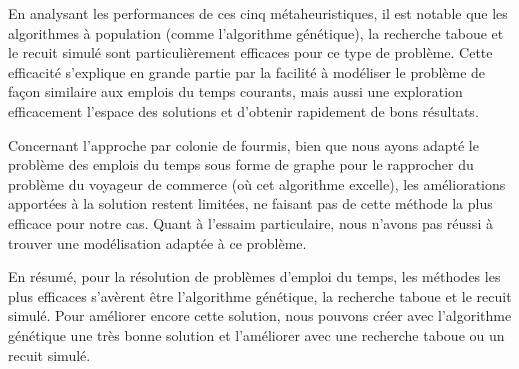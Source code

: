 
En analysant les performances de ces cinq métaheuristiques, il est notable que les algorithmes à population (comme l'algorithme génétique), la recherche taboue et le recuit simulé sont particulièrement efficaces pour ce type de problème.
Cette efficacité s'explique en grande partie par la facilité à modéliser le problème de façon similaire aux emplois du temps courants, mais aussi une exploration efficacement l'espace des solutions et d'obtenir rapidement de bons résultats.

Concernant l'approche par colonie de fourmis, bien que nous ayons adapté le problème des emplois du temps sous forme de graphe pour le rapprocher du problème du voyageur de commerce (où cet algorithme excelle), les améliorations apportées à la solution restent limitées, ne faisant pas de cette méthode la plus efficace pour notre cas.
Quant à l'essaim particulaire, nous n'avons pas réussi à trouver une modélisation adaptée à ce problème.

En résumé, pour la résolution de problèmes d'emploi du temps, les méthodes les plus efficaces s'avèrent être l'algorithme génétique, la recherche taboue et le recuit simulé.
Pour améliorer encore cette solution, nous pouvons créer avec l'algorithme génétique une très bonne solution et l'améliorer avec une recherche taboue ou un recuit simulé.
